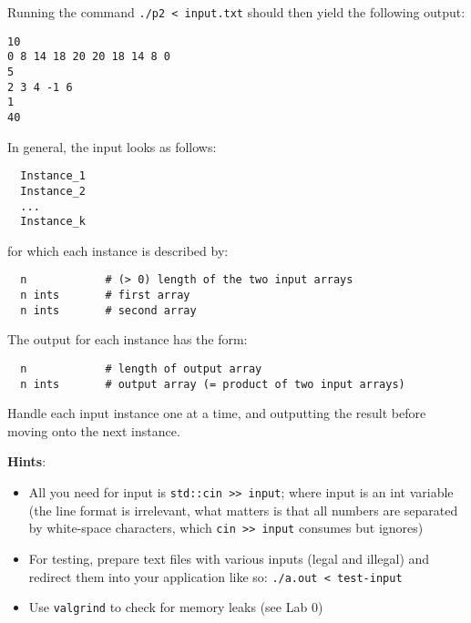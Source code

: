 \documentclass[a4paper,11pt]{article}
\begin{document}
Running the command \texttt{./p2 < input.txt} should then yield the following output:
\begin{verbatim}
10
0 8 14 18 20 20 18 14 8 0
5
2 3 4 -1 6
1
40
\end{verbatim}

In general, the input looks as follows:
\begin{verbatim}
  Instance_1
  Instance_2
  ...
  Instance_k
\end{verbatim}

for which each instance is described by:
\begin{verbatim}
  n            # (> 0) length of the two input arrays
  n ints       # first array
  n ints       # second array
\end{verbatim}

The output for each instance has the form:
\begin{verbatim}
  n            # length of output array
  n ints       # output array (= product of two input arrays)
\end{verbatim}

Handle each input instance one at a time, 
and outputting the result before moving onto the next instance.

\newpage

\textbf{Hints}:
\begin{itemize}
    \item All you need for input is \texttt{std::cin >> input}; where input is an int variable
        (the line format is irrelevant, what matters is that all numbers are
        separated by white-space characters, which \texttt{cin >> input} consumes but ignores)
    \item For testing, prepare text files with various inputs (legal and illegal) and
        redirect them into your application like so: \texttt{./a.out < test-input}
    \item Use \texttt{valgrind} to check for memory leaks (see Lab 0)
\end{itemize}
\end{document}
